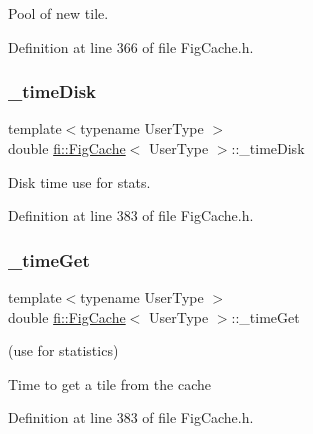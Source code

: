 Pool of new tile. 



Definition at line 366 of file Fig\+Cache.\+h.

\mbox{\label{classfi_1_1FigCache_af12e09bb66ab9be647c888e1040d5eef}} 
\subsubsection{\texorpdfstring{\+\_\+time\+Disk}{\_timeDisk}}
{\footnotesize\ttfamily template$<$typename User\+Type $>$ \\
double \hyperlink{classfi_1_1FigCache}{fi\+::\+Fig\+Cache}$<$ User\+Type $>$\+::\+\_\+time\+Disk\hspace{0.3cm}{\ttfamily [private]}}



Disk time use for stats. 



Definition at line 383 of file Fig\+Cache.\+h.

\mbox{\label{classfi_1_1FigCache_ac31074b360f7afe78e7fa08c32152acc}} 
\subsubsection{\texorpdfstring{\+\_\+time\+Get}{\_timeGet}}
{\footnotesize\ttfamily template$<$typename User\+Type $>$ \\
double \hyperlink{classfi_1_1FigCache}{fi\+::\+Fig\+Cache}$<$ User\+Type $>$\+::\+\_\+time\+Get\hspace{0.3cm}{\ttfamily [private]}}



(use for statistics) 

Time to get a tile from the cache 

Definition at line 383 of file Fig\+Cache.\+h.

\mbox{\label{classfi_1_1FigCache_aaeaaa4e96d4753da663ed5eb123f266d}} 
